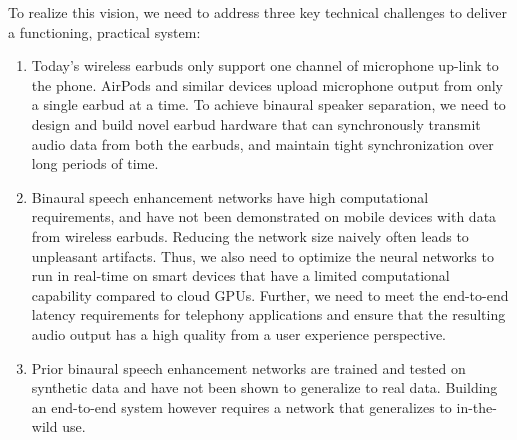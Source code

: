 \documentclass [11pt, proquest] {uwthesis}[2020/02/24]
\begin{document}
{To realize this vision, we need to address three key technical challenges to deliver a functioning, practical system:
\begin{enumerate}
    \item Today's wireless earbuds only support one channel of microphone up-link to the phone. AirPods and similar devices upload microphone output from only a single earbud at a time.  To achieve binaural speaker separation, we need to design and build novel earbud hardware that can synchronously transmit audio data from both the earbuds, and maintain tight synchronization over long periods of time.
    \item Binaural speech enhancement networks have high computational requirements, and have not been demonstrated on mobile devices with data from wireless earbuds. Reducing the network size naively often leads to unpleasant artifacts. Thus, we also need to optimize the neural networks to run in real-time on smart devices that have a limited computational capability compared to cloud GPUs. Further, we need to meet the end-to-end latency requirements for telephony applications and ensure that the resulting audio output has a high quality from a user experience perspective.
    \item Prior binaural speech enhancement networks are trained and tested on synthetic data and have not been shown to generalize  to real data. Building an end-to-end system however requires a network that generalizes to in-the-wild use. 
\end{enumerate}}
    

\end{document}
